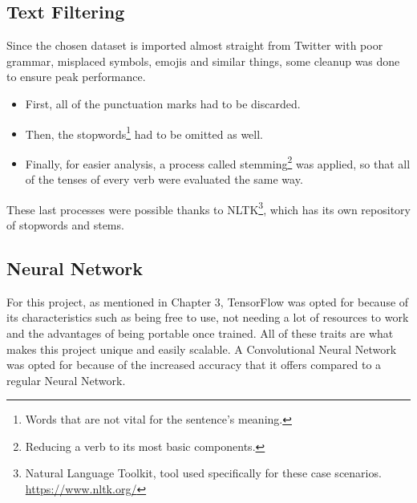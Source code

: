 \subsection{Text Filtering}
Since the chosen dataset is imported almost straight from Twitter with poor grammar, misplaced symbols, emojis and similar things, some cleanup was done to ensure peak performance.
\begin{itemize}
\item First, all of the punctuation marks had to be discarded.
\item Then, the stopwords\footnote{Words that are not vital for the sentence's meaning.} had to be omitted as well.
\item Finally, for easier analysis, a process called stemming\footnote{Reducing a verb to its most basic components.} was applied, so that all of the tenses of every verb were evaluated the same way.
\end{itemize} 
These last processes were possible thanks to NLTK\footnote{Natural Language Toolkit, tool used specifically for these case scenarios. \url{https://www.nltk.org/}}, which has its own repository of stopwords and stems.

\subsection{Neural Network}
For this project, as mentioned in Chapter 3, TensorFlow was opted for because of its characteristics such as being free to use, not needing a lot of resources to work and the advantages of being portable once trained. All of these traits are what makes this project unique and easily scalable.
A Convolutional Neural Network was opted for because of the increased accuracy that it offers compared to a regular Neural Network.